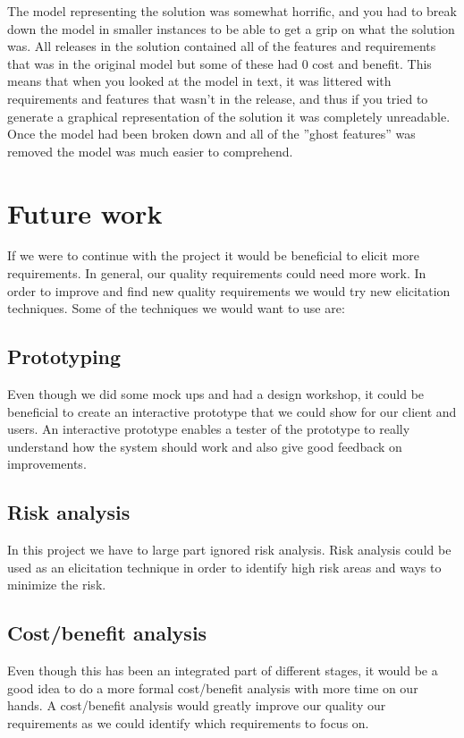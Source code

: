 \documentclass[a4paper]{article}
\begin{document}
				The model representing the solution was somewhat horrific, and you had to break down the model in smaller instances to be able to get a grip on what the solution was. All releases in the solution contained all of the features and requirements that was in the original model but some of these had 0 cost and benefit. This means that when you looked at the model in text, it was littered with requirements and features that wasn't in the release, and thus if you tried to generate a graphical representation of the solution it was completely unreadable. Once the model had been broken down and all of the ''ghost features'' was removed the model was much easier to comprehend.

	\section{Future work}
If we were to continue with the project it would be beneficial to elicit more requirements. In general, our quality requirements could need more work. In order to improve and find new quality requirements we would try new elicitation techniques. Some of the techniques we would want to use are:
	\subsection*{Prototyping}
	Even though we did some mock ups and had a design workshop, it could be beneficial to create an interactive prototype that we could show for our client and users. An interactive prototype enables a tester of the prototype to really understand how the system should work and also give good feedback on improvements.
	\subsection*{Risk analysis}
	In this project we have to large part ignored risk analysis. Risk analysis could be used as an elicitation technique in order to identify high risk areas and ways to minimize the risk.
	\subsection{Cost/benefit analysis}
	Even though this has been an integrated part of different stages, it would be a good idea to do a more formal cost/benefit analysis with more time on our hands. A cost/benefit analysis would greatly improve our quality our requirements as we could identify which requirements to focus on.
\end{document}
